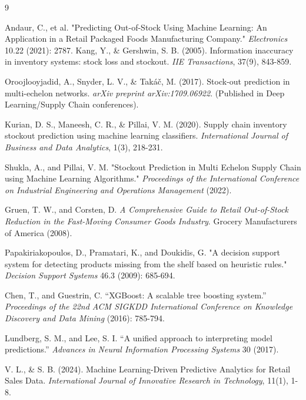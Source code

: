 \documentclass[11pt, a4paper]{article}
\begin{document}
\begin{thebibliography}{9}

Andaur, C., et al. "Predicting Out-of-Stock Using Machine Learning: An Application in a Retail Packaged Foods Manufacturing Company." \textit{Electronics} 10.22 (2021): 2787.
Kang, Y., \& Gershwin, S. B. (2005). Information inaccuracy in inventory systems: stock loss and stockout. \textit{IIE Transactions}, 37(9), 843-859.

Oroojlooyjadid, A., Snyder, L. V., \& Tak\'{a}\v{c}, M. (2017). Stock-out prediction in multi-echelon networks. \textit{arXiv preprint arXiv:1709.06922}. (Published in Deep Learning/Supply Chain conferences).

Kurian, D. S., Maneesh, C. R., \& Pillai, V. M. (2020). Supply chain inventory stockout prediction using machine learning classifiers. \textit{International Journal of Business and Data Analytics}, 1(3), 218-231.

Shukla, A., and Pillai, V. M. "Stockout Prediction in Multi Echelon Supply Chain using Machine Learning Algorithms." \textit{Proceedings of the International Conference on Industrial Engineering and Operations Management} (2022).

Gruen, T. W., and Corsten, D. \textit{A Comprehensive Guide to Retail Out-of-Stock Reduction in the Fast-Moving Consumer Goods Industry}. Grocery Manufacturers of America (2008).

Papakiriakopoulos, D., Pramatari, K., and Doukidis, G. "A decision support system for detecting products missing from the shelf based on heuristic rules." \textit{Decision Support Systems} 46.3 (2009): 685-694.

Chen, T., and Guestrin, C. ``XGBoost: A scalable tree boosting system.'' \textit{Proceedings of the 22nd ACM SIGKDD International Conference on Knowledge Discovery and Data Mining} (2016): 785-794.

Lundberg, S. M., and Lee, S. I. ``A unified approach to interpreting model predictions.'' \textit{Advances in Neural Information Processing Systems} 30 (2017).

V. L., \& S. B. (2024). Machine Learning-Driven Predictive Analytics for Retail Sales Data. \textit{International Journal of Innovative Research in Technology}, 11(1), 1-8.


\end{thebibliography}
\end{document}

